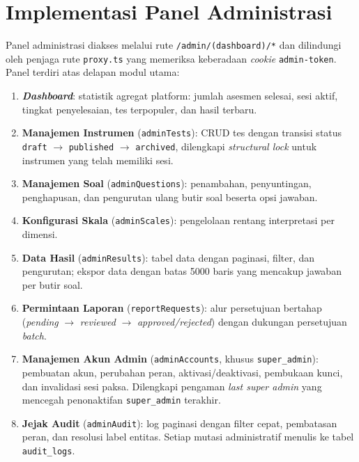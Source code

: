 \section{Implementasi Panel Administrasi}
\label{sec:impl-admin}

Panel administrasi diakses melalui rute \texttt{/admin/(dashboard)/*} dan dilindungi oleh penjaga rute \texttt{proxy.ts} yang memeriksa keberadaan \textit{cookie} \texttt{admin-token}. Panel terdiri atas delapan modul utama:

\begin{enumerate}[leftmargin=2cm]
  \item \textbf{\textit{Dashboard}}: statistik agregat platform: jumlah asesmen selesai, sesi aktif, tingkat penyelesaian, tes terpopuler, dan hasil terbaru.
  \item \textbf{Manajemen Instrumen} (\texttt{adminTests}): CRUD tes dengan transisi status \texttt{draft} $\rightarrow$ \texttt{published} $\rightarrow$ \texttt{archived}, dilengkapi \textit{structural lock} untuk instrumen yang telah memiliki sesi.
  \item \textbf{Manajemen Soal} (\texttt{adminQuestions}): penambahan, penyuntingan, penghapusan, dan pengurutan ulang butir soal beserta opsi jawaban.
  \item \textbf{Konfigurasi Skala} (\texttt{adminScales}): pengelolaan rentang interpretasi per dimensi.
  \item \textbf{Data Hasil} (\texttt{adminResults}): tabel data dengan paginasi, filter, dan pengurutan; ekspor data dengan batas 5000 baris yang mencakup jawaban per butir soal.
  \item \textbf{Permintaan Laporan} (\texttt{reportRequests}): alur persetujuan bertahap (\textit{pending} $\rightarrow$ \textit{reviewed} $\rightarrow$ \textit{approved/rejected}) dengan dukungan persetujuan \textit{batch}.
  \item \textbf{Manajemen Akun Admin} (\texttt{adminAccounts}, khusus \texttt{super\_admin}): pembuatan akun, perubahan peran, aktivasi/deaktivasi, pembukaan kunci, dan invalidasi sesi paksa. Dilengkapi pengaman \textit{last super admin} yang mencegah penonaktifan \texttt{super\_admin} terakhir.
  \item \textbf{Jejak Audit} (\texttt{adminAudit}): log paginasi dengan filter cepat, pembatasan peran, dan resolusi label entitas. Setiap mutasi administratif menulis ke tabel \texttt{audit\_logs}.
\end{enumerate}

